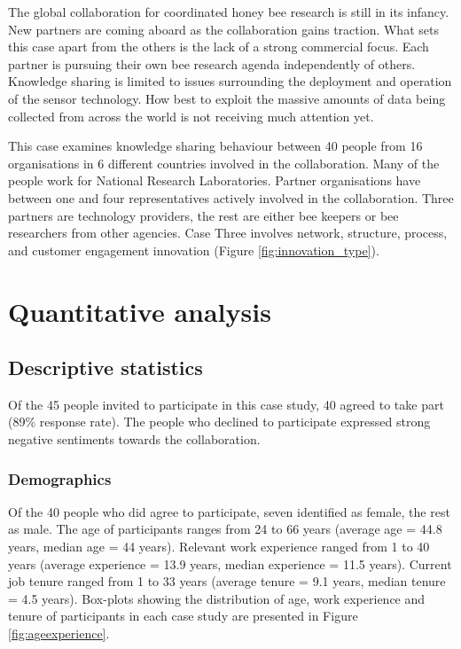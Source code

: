 The global collaboration for coordinated honey bee research is still in its infancy. New partners are coming aboard as the collaboration gains traction. What sets this case apart from the others is the lack of a strong commercial focus. Each partner is pursuing their own bee research agenda independently of others. Knowledge sharing is limited to issues surrounding the deployment and operation of the sensor technology. How best to exploit the massive amounts of data being collected from across the world is not receiving much attention yet.\medskip  

This case examines knowledge sharing behaviour between 40 people from 16 organisations in 6 different countries involved in the collaboration. Many of the people work for National Research Laboratories. Partner organisations have between one and four representatives actively involved in the collaboration. Three partners are technology providers, the rest are either bee keepers or bee researchers from other agencies. Case Three involves network, structure, process, and customer engagement innovation (Figure \ref{fig:innovation_type}).


\section{Quantitative analysis}

\subsection{Descriptive statistics}

Of the 45 people invited to participate in this case study, 40 agreed to take part (89\% response rate). The people who declined to participate expressed strong negative sentiments towards the collaboration.

\subsubsection{Demographics}

Of the 40 people who did agree to participate, seven identified as female, the rest as male. The age of participants ranges from 24 to 66 years (average age = 44.8 years, median age = 44 years). Relevant work experience ranged from 1 to 40 years (average experience = 13.9 years, median experience = 11.5 years). Current job tenure ranged from 1 to 33 years (average tenure = 9.1 years, median tenure = 4.5 years). Box-plots showing the distribution of age, work experience and tenure of participants in each case study are presented in Figure \ref{fig:ageexperience}.\medskip

